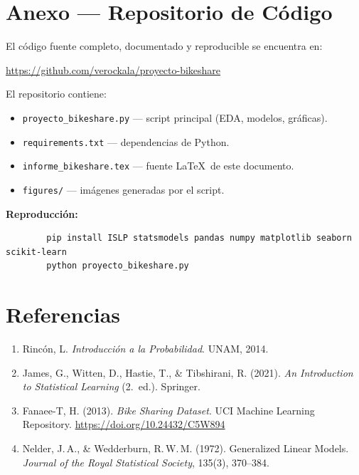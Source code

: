 \documentclass[12pt, a4paper]{article}
\begin{document}
	\section*{Anexo --- Repositorio de C\'odigo}
	
	El c\'odigo fuente completo, documentado y reproducible se encuentra en:
	
	\begin{center}
		\url{https://github.com/verockala/proyecto-bikeshare}
	\end{center}
	
	\noindent El repositorio contiene:
	\begin{itemize}[noitemsep]
		\item \texttt{proyecto\_bikeshare.py} --- script principal (EDA, modelos, gr\'aficas).
		\item \texttt{requirements.txt} --- dependencias de Python.
		\item \texttt{informe\_bikeshare.tex} --- fuente \LaTeX\ de este documento.
		\item \texttt{figures/} --- im\'agenes generadas por el script.
	\end{itemize}
	
	\noindent \textbf{Reproducci\'on:}
	\begin{verbatim}
		pip install ISLP statsmodels pandas numpy matplotlib seaborn scikit-learn
		python proyecto_bikeshare.py
	\end{verbatim}
	
	\section*{Referencias}
	
	\begin{enumerate}
		\item Rinc\'on, L. \textit{Introducci\'on a la Probabilidad}. UNAM, 2014.
		\item James, G., Witten, D., Hastie, T., \& Tibshirani, R. (2021).
		\textit{An Introduction to Statistical Learning} (2.\textordfeminine~ed.).
		Springer.
		\item Fanaee-T, H. (2013). \textit{Bike Sharing Dataset}.
		UCI Machine Learning Repository.
		\url{https://doi.org/10.24432/C5W894}
		\item Nelder, J.\,A., \& Wedderburn, R.\,W.\,M. (1972).
		Generalized Linear Models.
		\textit{Journal of the Royal Statistical Society}, 135(3), 370--384.
	\end{enumerate}
	
\end{document}
